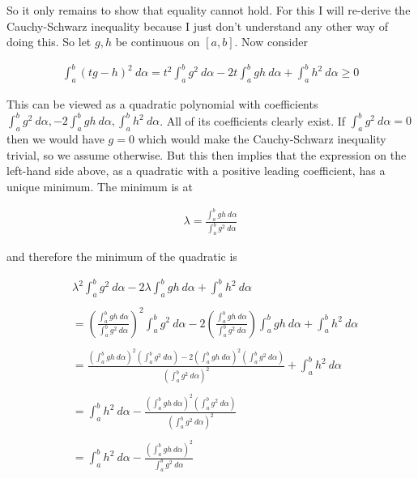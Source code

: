 \documentclass{article}
\begin{document}
  So it only remains to show that equality cannot hold.  For this I will re-derive the Cauchy-Schwarz inequality because I just don't understand any other way of doing this.  So let $g,h$ be continuous on $[a,b]$. Now consider 
  
  \begin{align*}
    \int_a^b (tg-h)^2 \ d\alpha = t^2\int_a^b g^2 \ d\alpha - 2 t \int_a^b gh\ d\alpha + \int_a^b h^2 \ d\alpha \geq 0
  \end{align*}

  This can be viewed as a quadratic polynomial with coefficients $\int_a^b g^2 \ d\alpha,\allowbreak -2\int_a^b gh \ d\alpha, \allowbreak \int_a^b h^2 \ d\alpha$.  All of its coefficients clearly exist.  If $\int_a^b g^2 \ d\alpha = 0$ then we would have $g = 0$ which would make the Cauchy-Schwarz inequality trivial, so we assume otherwise.  But this then implies that the expression on the left-hand side above, as a quadratic with a positive leading coefficient, has a unique minimum. The minimum is at

  \begin{align*}
    \lambda = \frac{\int_a^b gh \ d\alpha}{\int_a^b g^2 \ d\alpha}
  \end{align*}

  and therefore the minimum of the quadratic is 

  \begin{align*}
    &\lambda^2\int_a^b g^2 \ d\alpha - 2 \lambda \int_a^b gh\ d\alpha + \int_a^b h^2 \ d\alpha \\\\
    &= \left( \frac{\int_a^b gh \ d\alpha}{\int_a^b g^2 \ d\alpha} \right)^2 \int_a^b g^2 \ d\alpha - 2 \left( \frac{\int_a^b gh \ d\alpha}{\int_a^b g^2 \ d\alpha} \right) \int_a^b gh\ d\alpha + \int_a^b h^2 \ d\alpha \\\\
    &= \frac{\left(\int_a^b gh \ d\alpha\right)^2 \left(\int_a^b g^2 \ d \alpha\right)-2\left(\int_a^b gh \ d\alpha\right)^2\left(\int_a^b g^2 \ d\alpha\right)}{\left(\int_a^b g^2 \ d\alpha\right)^2} + \int_a^b h^2 \ d\alpha \\\\
    &= \int_a^b h^2 \ d\alpha - \frac{\left(\int_a^b gh \ d\alpha \right)^2\left(\int_a^b g^2 \ d\alpha\right)}{\left(\int_a^b g^2 \ d\alpha\right)^2} \\\\
    &= \int_a^b h^2 \ d\alpha - \frac{\left(\int_a^b gh \ d\alpha \right)^2}{\int_a^b g^2 \ d\alpha}
  \end{align*}
\end{document}
